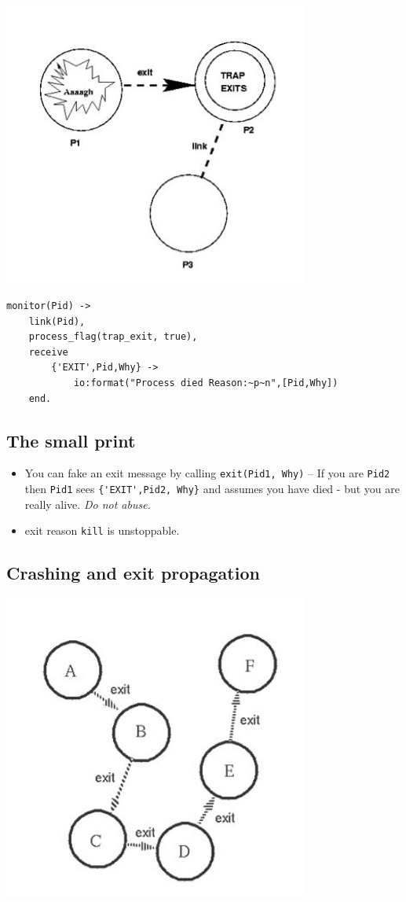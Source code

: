 \documentclass[12pt]{article}
\begin{document}
\includegraphics[width=10cm]{images/trap.jpg}

\begin{verbatim}
monitor(Pid) ->
    link(Pid),
    process_flag(trap_exit, true),
    receive
        {'EXIT',Pid,Why} ->
            io:format("Process died Reason:~p~n",[Pid,Why])
    end.
\end{verbatim}

\subsection{The small print}

\begin{itemize}
\item You can fake an exit message by calling \verb+exit(Pid1, Why)+ -- If you are \verb+Pid2+ then \verb+Pid1+ sees \verb+{'EXIT',Pid2, Why}+ and assumes you have died - but you are really alive.
{\sl Do not abuse.}
\item exit reason \verb+kill+ is unstoppable.
\end{itemize}

\subsection{Crashing and exit propagation}

\includegraphics[width=10cm]{images/exits.jpg}
\end{document}
